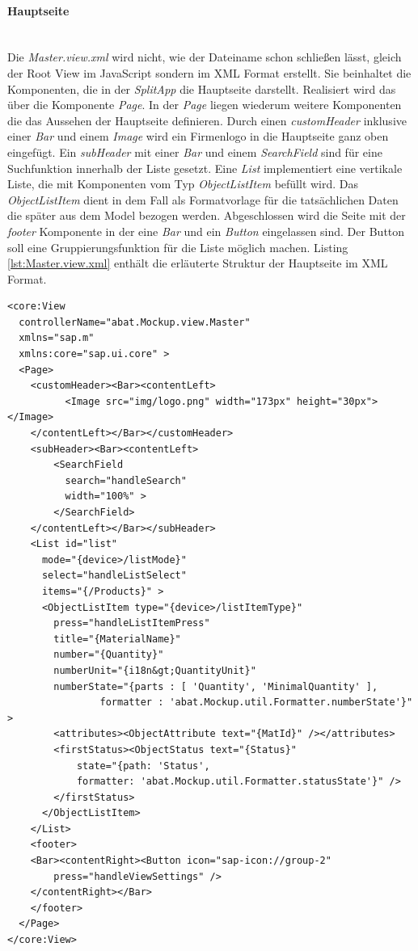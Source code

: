 \paragraph{Hauptseite}$\;$ \\
Die \textit{Master.view.xml} wird nicht, wie der Dateiname schon schließen lässt, gleich der Root View im JavaScript sondern im XML Format erstellt. Sie beinhaltet die Komponenten, die in der \textit{SplitApp} die Hauptseite darstellt. Realisiert wird das über die Komponente \textit{Page}. In der \textit{Page} liegen wiederum weitere Komponenten die das Aussehen der Hauptseite definieren. Durch einen \textit{customHeader} inklusive einer \textit{Bar} und einem \textit{Image} wird ein Firmenlogo in die Hauptseite ganz oben eingefügt. Ein \textit{subHeader} mit einer \textit{Bar} und einem \textit{SearchField} sind für eine Suchfunktion innerhalb der Liste gesetzt. Eine \textit{List} implementiert eine vertikale Liste, die mit Komponenten vom Typ \textit{ObjectListItem} befüllt wird. Das \textit{ObjectListItem} dient in dem Fall als Formatvorlage für die tatsächlichen Daten die später aus dem Model bezogen werden. Abgeschlossen wird die Seite mit der \textit{footer} Komponente in der eine \textit{Bar} und ein \textit{Button} eingelassen sind. Der Button soll eine Gruppierungsfunktion für die Liste möglich machen. Listing \ref{lst:Master.view.xml} enthält die erläuterte Struktur der Hauptseite im XML Format.

\vspace{1em}
\begin{lstlisting}[frame=htrbl, caption=Hauptseite der SplitApp, label=lst:Master.view.xml]
<core:View
  controllerName="abat.Mockup.view.Master"
  xmlns="sap.m"
  xmlns:core="sap.ui.core" >
  <Page>
    <customHeader><Bar><contentLeft>
          <Image src="img/logo.png" width="173px" height="30px"></Image>
    </contentLeft></Bar></customHeader>
    <subHeader><Bar><contentLeft>
        <SearchField
          search="handleSearch"
          width="100%" >
        </SearchField>
    </contentLeft></Bar></subHeader>
    <List id="list"
      mode="{device>/listMode}"
      select="handleListSelect"
      items="{/Products}" >
      <ObjectListItem type="{device>/listItemType}"
        press="handleListItemPress"
        title="{MaterialName}"
        number="{Quantity}"
        numberUnit="{i18n&gt;QuantityUnit}"
        numberState="{parts : [ 'Quantity', 'MinimalQuantity' ],
                formatter : 'abat.Mockup.util.Formatter.numberState'}" >
        <attributes><ObjectAttribute text="{MatId}" /></attributes>
        <firstStatus><ObjectStatus text="{Status}"
            state="{path: 'Status',
            formatter: 'abat.Mockup.util.Formatter.statusState'}" />
        </firstStatus>
      </ObjectListItem>
    </List>
    <footer>
    <Bar><contentRight><Button icon="sap-icon://group-2"
        press="handleViewSettings" />
    </contentRight></Bar>
    </footer>
  </Page>
</core:View>
\end{lstlisting}

